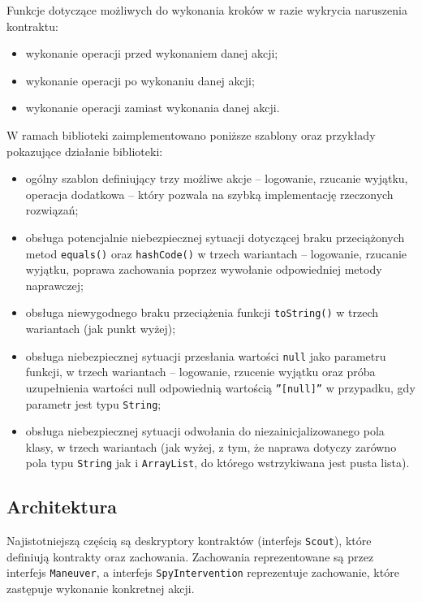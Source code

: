 \documentclass[12pt,a4paper,titlepage]{article}
\begin{document}
    Funkcje dotyczące możliwych do wykonania kroków w razie wykrycia naruszenia kontraktu:
    \begin{itemize}
     \item wykonanie operacji przed wykonaniem danej akcji;
     \item wykonanie operacji po wykonaniu danej akcji;
     \item wykonanie operacji zamiast wykonania danej akcji.
    \end{itemize}
    
    W ramach biblioteki zaimplementowano poniższe szablony oraz przykłady pokazujące działanie biblioteki:
    \begin{itemize}
     \item ogólny szablon definiujący trzy możliwe akcje -- logowanie, rzucanie wyjątku, operacja dodatkowa -- który pozwala na szybką implementację rzeczonych rozwiązań;
     \item obsługa potencjalnie niebezpiecznej sytuacji dotyczącej braku przeciążonych metod \texttt{equals()} oraz \texttt{hashCode()} w trzech wariantach -- logowanie, rzucanie wyjątku, poprawa zachowania poprzez wywołanie odpowiedniej metody naprawczej;
     \item obsługa niewygodnego braku przeciążenia funkcji \texttt{toString()} w trzech wariantach (jak punkt wyżej);
     \item obsługa niebezpiecznej sytuacji przesłania wartości \texttt{null} jako parametru funkcji, w trzech wariantach -- logowanie, rzucenie wyjątku oraz próba uzupełnienia wartości null odpowiednią wartością \texttt{''[null]''} w przypadku, gdy parametr jest typu \texttt{String};
     \item obsługa niebezpiecznej sytuacji odwołania do niezainicjalizowanego pola klasy, w trzech wariantach (jak wyżej, z tym, że naprawa dotyczy zarówno pola typu \texttt{String} jak i \texttt{ArrayList}, do którego wstrzykiwana jest pusta lista).
    \end{itemize}
    
  \subsection{Architektura}
   Najistotniejszą częścią są deskryptory kontraktów (interfejs \texttt{Scout}), które definiują kontrakty oraz zachowania. Zachowania reprezentowane są przez interfejs \texttt{Maneuver}, a interfejs \texttt{SpyIntervention} reprezentuje zachowanie, które zastępuje wykonanie konkretnej akcji.
   
\end{document}
